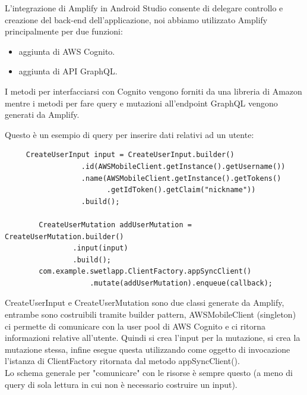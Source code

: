 L'integrazione di Amplify in Android Studio consente di delegare controllo e creazione del back-end dell'applicazione, noi abbiamo utilizzato Amplify principalmente per due funzioni:

\begin{itemize}
    \item aggiunta di AWS Cognito.
    \item aggiunta di API GraphQL.
\end{itemize}

I metodi per interfacciarsi con Cognito vengono forniti da una libreria di Amazon mentre i metodi per fare query e mutazioni all'endpoint GraphQL vengono generati da Amplify.


Questo è un esempio di query per inserire dati relativi ad un utente:

\begin{verbatim}
     CreateUserInput input = CreateUserInput.builder()
                  .id(AWSMobileClient.getInstance().getUsername())
                  .name(AWSMobileClient.getInstance().getTokens()
                  		.getIdToken().getClaim("nickname"))
                  .build();

        CreateUserMutation addUserMutation = CreateUserMutation.builder()
                .input(input)
                .build();
        com.example.swetlapp.ClientFactory.appSyncClient()
        			.mutate(addUserMutation).enqueue(callback);
\end{verbatim}

CreateUserInput e CreateUserMutation sono due classi generate da Amplify, entrambe sono costruibili tramite builder pattern, AWSMobileClient (singleton) ci permette di comunicare con la user pool di AWS Cognito e ci ritorna informazioni relative all'utente. Quindi si crea l'input per la mutazione, si crea la mutazione stessa, infine esegue questa utilizzando come oggetto di invocazione l'istanza di ClientFactory ritornata dal metodo appSyncClient().\\
Lo schema generale per "comunicare" con le risorse è sempre questo (a meno di query di sola lettura in cui non è necessario costruire un input).


